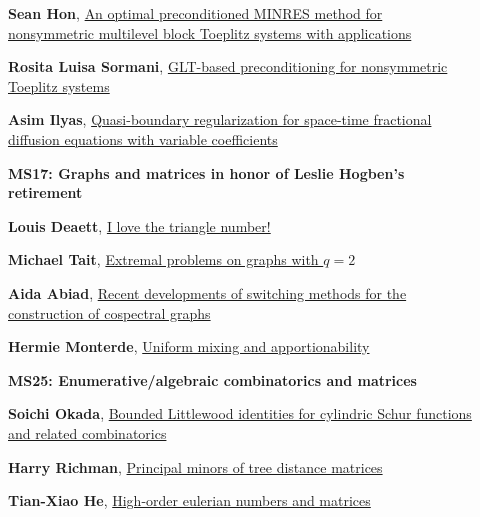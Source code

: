 \documentclass[ILAS2025-program.tex]{subfiles}
\begin{document}
\begin{description}
\begin{description}
        \item[] \hypertarget{up0174}{}\textbf{Sean Hon}, \hyperlink{down0174}{An optimal preconditioned MINRES method for nonsymmetric multilevel block Toeplitz systems with applications}
        \item[] \hypertarget{up0175}{}\textbf{Rosita Luisa Sormani}, \hyperlink{down0175}{GLT-based preconditioning for nonsymmetric Toeplitz systems}
        \item[] \hypertarget{up0176}{}\textbf{Asim Ilyas}, \hyperlink{down0176}{Quasi-boundary regularization for space-time fractional diffusion equations with variable coefficients}
        \end{description}
    \begin{description}
    \item[] {\color{mstitle}\textbf{MS17: Graphs and matrices in honor of Leslie Hogben's retirement}} 
    \item[] \hypertarget{up0177}{}\textbf{Louis Deaett}, \hyperlink{down0177}{I love the triangle number!}
        \item[] \hypertarget{up0178}{}\textbf{Michael Tait}, \hyperlink{down0178}{Extremal problems on graphs with $q=2$}
        \item[] \hypertarget{up0179}{}\textbf{Aida Abiad}, \hyperlink{down0179}{Recent developments of switching methods for the construction of cospectral graphs}
        \item[] \hypertarget{up0180}{}\textbf{Hermie Monterde}, \hyperlink{down0180}{Uniform mixing and apportionability
}
        \end{description}
    \begin{description}
    \item[] {\color{mstitle}\textbf{MS25: Enumerative/algebraic combinatorics and matrices}} 
    \item[] \hypertarget{up0181}{}\textbf{Soichi Okada}, \hyperlink{down0181}{Bounded Littlewood identities for cylindric Schur functions and related combinatorics}
        \item[] \hypertarget{up0182}{}\textbf{Harry Richman}, \hyperlink{down0182}{Principal minors of tree distance matrices}
        \item[] \hypertarget{up0183}{}\textbf{Tian-Xiao He}, \hyperlink{down0183}{High-order eulerian numbers and matrices}

\end{description}
\end{description}
\end{document}
